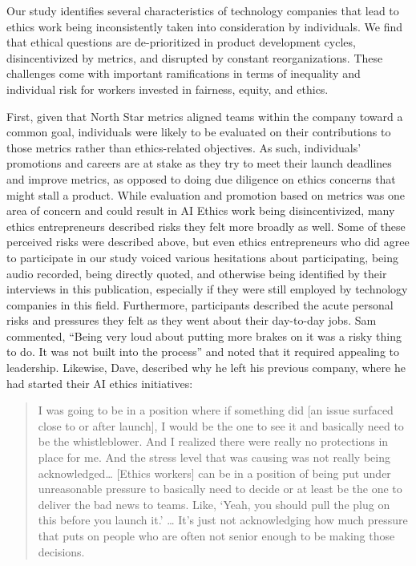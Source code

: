 \documentclass[sigconf]{acmart}
\begin{document}
Our study identifies several characteristics of technology companies that lead to ethics work being inconsistently taken into consideration by individuals. We find that ethical questions are de-prioritized in product development cycles, disincentivized by metrics, and disrupted by constant reorganizations. These challenges come with important ramifications in terms of inequality and individual risk for workers invested in fairness, equity, and ethics. 

First, given that North Star metrics aligned teams within the company toward a common goal, individuals were likely to be evaluated on their contributions to those metrics rather than ethics-related objectives. As such, individuals’ promotions and careers are at stake as they try to meet their launch deadlines and improve metrics, as opposed to doing due diligence on ethics concerns that might stall a product. While evaluation and promotion based on metrics was one area of concern and could result in AI Ethics work being disincentivized, many ethics entrepreneurs described risks they felt more broadly as well. Some of these perceived risks were described above, but even ethics entrepreneurs who did agree to participate in our study voiced various hesitations about participating, being audio recorded, being directly quoted, and otherwise being identified by their interviews in this publication, especially if they were still employed by technology companies in this field. Furthermore, participants described the acute personal risks and pressures they felt as they went about their day-to-day jobs. Sam commented, “Being very loud about putting more brakes on it was a risky thing to do. It was not built into the process” and noted that it required appealing to leadership. Likewise, Dave, described why he left his previous company, where he had started their AI ethics initiatives:

\begin{quote}
    I was going to be in a position where if something did [an issue surfaced close to or after launch], I would be the one to see it and basically need to be the whistleblower. And I realized there were really no protections in place for me. And the stress level that was causing was not really being acknowledged… [Ethics workers] can be in a position of being put under unreasonable pressure to basically need to decide or at least be the one to deliver the bad news to teams. Like, ‘Yeah, you should pull the plug on this before you launch it.’ … It’s just not acknowledging how much pressure that puts on people who are often not senior enough to be making those decisions.

\end{quote}
\end{document}
